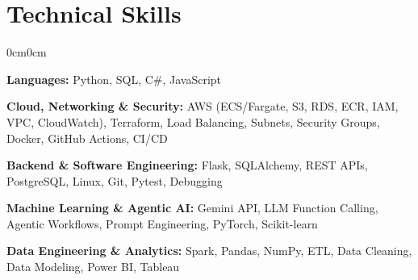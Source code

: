 \documentclass[10pt, letterpaper]{article}
\newenvironment{onecolentry}{
    \begin{adjustwidth}{0cm}{0cm}
}{
    \end{adjustwidth}
}
\begin{document}

\section{Technical Skills}

\begin{onecolentry}
    \textbf{Languages:} Python, SQL, C\#, JavaScript

    \vspace{1pt}

    \textbf{Cloud, Networking \& Security:}
    AWS (ECS/Fargate, S3, RDS, ECR, IAM, VPC, CloudWatch), Terraform,
    Load Balancing, Subnets, Security Groups, Docker, GitHub Actions, CI/CD

    \vspace{1pt}

    \textbf{Backend \& Software Engineering:}
    Flask, SQLAlchemy, REST APIs, PostgreSQL, Linux, Git, Pytest, Debugging

    \vspace{1pt}

    \textbf{Machine Learning \& Agentic AI:}
    Gemini API, LLM Function Calling, Agentic Workflows, Prompt Engineering,
    PyTorch, Scikit-learn

    \vspace{1pt}

    \textbf{Data Engineering \& Analytics:}
    Spark, Pandas, NumPy, ETL, Data Cleaning, Data Modeling,
    Power BI, Tableau
\end{onecolentry}
\end{document}
